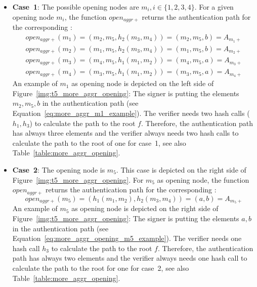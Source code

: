 \begin{itemize}
\label{list:case1_case_2}
\item \textbf{Case~1}: The possible opening nodes are $m_i, i \in \{1,2,3,4\}$. For a given opening node $m_i$, the function $open_{aggr+}$ returns the authentication path for the corresponding \tfblock:
\begin{align}
open_{aggr+}(m_1) = (m_2, m_5, h_2(m_3, m_4)) = (m_2, m_5, b) = A_{m_1+} \label{eq:more_aggr_m1_example} \\
open_{aggr+}(m_2) = (m_1, m_5, h_2(m_3, m_4)) = (m_1, m_5, b) = A_{m_2+} \\
open_{aggr+}(m_3) = (m_4, m_5, h_1(m_1, m_2)) = (m_4, m_5, a) = A_{m_3+} \\
open_{aggr+}(m_4) = (m_3, m_5, h_1(m_1, m_2)) = (m_3, m_5, a) = A_{m_4+} \label{eq:more_aggr_m4_example}
\end{align} 
An example of $m_1$ as opening node is depicted on the left side of Figure~\ref{img:t5_more_aggr_opening}: The signer is putting the elements $m_2, m_5, b$ in the authentication path (see Equation~\ref{eq:more_aggr_m1_example}). The verifier needs two hash calls ($h_1, h_3$) to calculate the path to the root $f$.
Therefore, the authentication path has always three elements and the verifier always needs two hash calls to calculate the path to the root of one \tfblock for case~1, see also Table~\ref{table:more_aggr_opening}.

\item \textbf{Case~2}: The opening node is $m_5$. This case is depicted on the right side of Figure~\ref{img:t5_more_aggr_opening}. For $m_5$ as opening node, the function $open_{aggr+}$ returns the authentication path for the corresponding \tfblock:
\begin{equation}
\label{eq:more_aggr_opening_m5_example}
open_{aggr+}(m_5) = (h_1(m_1, m_2), h_2(m_3, m_4)) = (a, b) = A_{m_5+}
\end{equation}
An example of $m_5$ as opening node is depicted on the right side of Figure~\ref{img:t5_more_aggr_opening}: The signer is putting the elements $a, b$ in the authentication path (see Equation~\ref{eq:more_aggr_opening_m5_example}). The verifier needs one hash call $h_3$ to calculate the path to the root $f$.
Therefore, the authentication path has always two elements and the verifier always needs one hash call to calculate the path to the root for one \tfblock for case~2, see also Table~\ref{table:more_aggr_opening}.
\end{itemize} 

